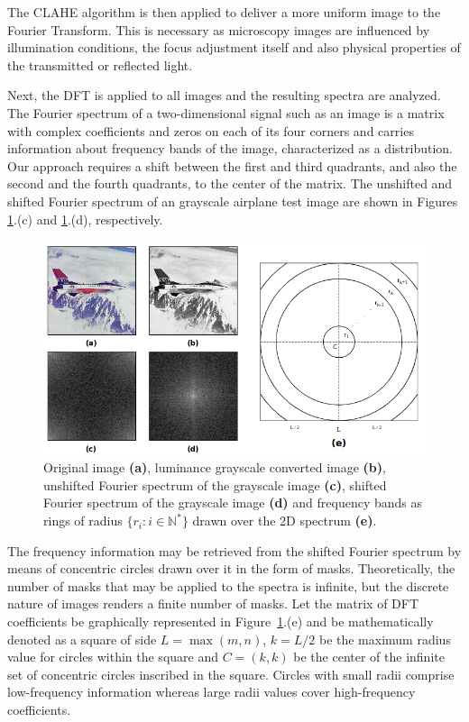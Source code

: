 The CLAHE algorithm is then applied to deliver a more uniform image to the Fourier Transform. This is necessary as microscopy images are influenced by illumination conditions, the focus adjustment itself and also physical properties of the transmitted or reflected light.

Next, the DFT is applied to all images and the resulting spectra are analyzed. The Fourier spectrum of a two-dimensional signal such as an image is a matrix with complex coefficients and zeros on each of its four corners and carries information about frequency bands of the image, characterized as a distribution. Our approach requires a shift between the first and third quadrants, and also the second and the fourth quadrants, to the center of the matrix. The unshifted and shifted Fourier spectrum of an grayscale airplane test image are shown in Figures \ref{fig:fourier_spectrum}.(c) and \ref{fig:fourier_spectrum}.(d), respectively. 

\begin{figure}[ht]
	\centering
	\caption{Original image \textbf{(a)}, luminance grayscale converted image \textbf{(b)}, unshifted Fourier spectrum of the grayscale image \textbf{(c)}, shifted Fourier spectrum of the grayscale image \textbf{(d)} and frequency bands as rings of radius $\{r_{i}: i\in\mathbb{N}^{*}\}$ drawn over the 2D spectrum \textbf{(e)}.}
	\label{fig:fourier_spectrum}
	\includegraphics[scale=0.6]{images/fourier_spectrum.png}
	\centering
	\fautor
\end{figure}

The frequency information may be retrieved from the shifted Fourier spectrum by means of concentric circles drawn over it in the form of masks. Theoretically, the number of masks that may be applied to the spectra is infinite, but the discrete nature of images renders a finite number of masks. Let the matrix of DFT coefficients be graphically represented in Figure~\ref{fig:fourier_spectrum}.(e) and be mathematically denoted as a square of side $L = \max{(m,n)}$, $k = L / 2$ be the maximum radius value for circles within the square and $C = (k,k)$ be the center of the infinite set of concentric circles inscribed in the square. Circles with small radii comprise low-frequency information whereas large radii values cover high-frequency coefficients.

